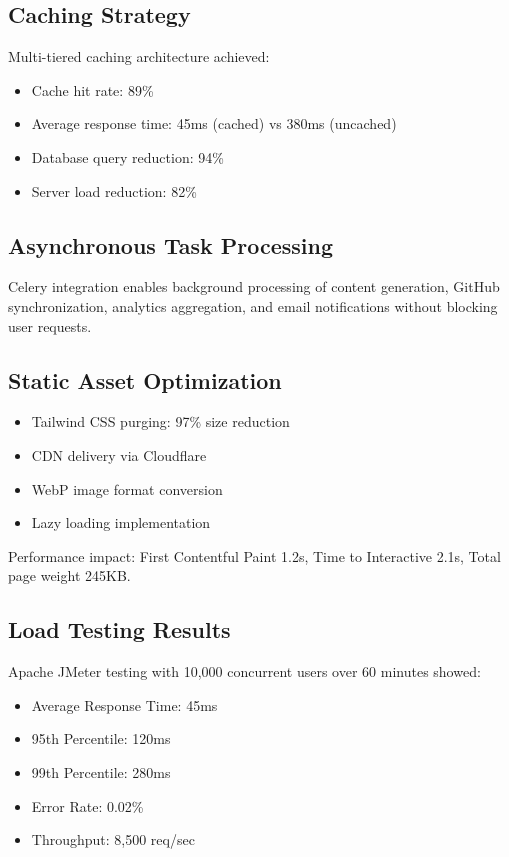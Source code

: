 \documentclass[conference]{IEEEtran}
\begin{document}
\subsection{Caching Strategy}

Multi-tiered caching architecture achieved:
\begin{itemize}
    \item Cache hit rate: 89\%
    \item Average response time: 45ms (cached) vs 380ms (uncached)
    \item Database query reduction: 94\%
    \item Server load reduction: 82\%
\end{itemize}

\subsection{Asynchronous Task Processing}

Celery integration enables background processing of content generation, GitHub synchronization, analytics aggregation, and email notifications without blocking user requests.

\subsection{Static Asset Optimization}

\begin{itemize}
    \item Tailwind CSS purging: 97\% size reduction
    \item CDN delivery via Cloudflare
    \item WebP image format conversion
    \item Lazy loading implementation
\end{itemize}

Performance impact: First Contentful Paint 1.2s, Time to Interactive 2.1s, Total page weight 245KB.

\subsection{Load Testing Results}

Apache JMeter testing with 10,000 concurrent users over 60 minutes showed:
\begin{itemize}
    \item Average Response Time: 45ms
    \item 95th Percentile: 120ms
    \item 99th Percentile: 280ms
    \item Error Rate: 0.02\%
    \item Throughput: 8,500 req/sec
\end{itemize}
\end{document}
